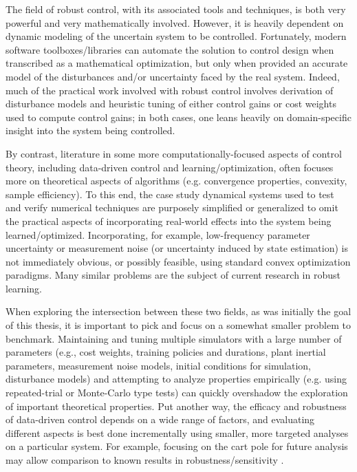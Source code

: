 The field of robust control, with its associated tools and techniques, is both very powerful and very mathematically involved.  However, it is heavily dependent on dynamic modeling of the uncertain system to be controlled.  Fortunately, modern software toolboxes/libraries can automate the solution to control design when transcribed as a mathematical optimization, but only when provided an accurate model of the disturbances and/or uncertainty faced by the real system.  Indeed, much of the practical work involved with robust control involves derivation of disturbance models and heuristic tuning of either control gains or cost weights used to compute control gains; in both cases, one leans heavily on domain-specific insight into the system being controlled.

By contrast, literature in some more computationally-focused aspects of control theory, including data-driven control and learning/optimization, often focuses more on theoretical aspects of algorithms (e.g. convergence properties, convexity, sample efficiency).  To this end, the case study dynamical systems used to test and verify numerical techniques are purposely simplified or generalized to omit the practical aspects of incorporating real-world effects into the system being learned/optimized.  Incorporating, for example, low-frequency parameter uncertainty or measurement noise (or uncertainty induced by state estimation) is not immediately obvious, or possibly feasible, using standard convex optimization paradigms.  Many similar problems are the subject of current research in robust learning.

When exploring the intersection between these two fields, as was initially the goal of this thesis, it is important to pick and focus on a somewhat smaller problem to benchmark.  Maintaining and tuning multiple simulators with a large number of parameters (e.g., cost weights, training policies and durations, plant inertial parameters, measurement noise models, initial conditions for simulation, disturbance models) and attempting to analyze properties empirically (e.g. using repeated-trial or Monte-Carlo type tests) can quickly overshadow the exploration of important theoretical properties.  Put another way, the efficacy and robustness of data-driven control depends on a wide range of factors, and evaluating different aspects is best done incrementally using smaller, more targeted analyses on a particular system.  For example, focusing on the cart pole for future analysis may allow comparison to known results in robustness/sensitivity \cite{leong2016understanding,bernat2020driver}.


